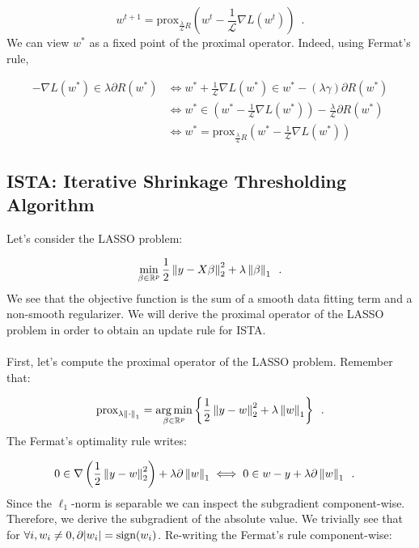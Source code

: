 \documentclass[a4paper,10pt]{article}
\theoremstyle{definition}
\begin{document}
\begin{equation*}
    w^{t+1} = \text{prox}_{\frac{\lambda}{\mathcal{L}}R}
    (w^t - \frac{1}{\mathcal{L}}\nabla L(w^{t}))
    \enspace .
\end{equation*}
%
We can view $w^*$ as a fixed point of the proximal operator. Indeed, using Fermat's rule,

\begin{align*}
    -\nabla L(w^*) \in \lambda \partial R(w^*)
    & \iff w^* + \frac{1}{\mathcal{L}} \nabla L(w^*) \in w^* - (\lambda\gamma) \partial R(w^*) \\
    & \iff w^* \in (w^* - \frac{1}{\mathcal{L}} \nabla L(w^*)) - \frac{\lambda}{\mathcal{L}} \partial R(w^*) \\
    & \iff w^* = \text{prox}_{\frac{\lambda}{\mathcal{L}} R}(w^* - \frac{1}{\mathcal{L}} \nabla L(w^*))
\end{align*}

\subsection*{ISTA: Iterative Shrinkage Thresholding Algorithm}
\label{ista}

Let's consider the LASSO problem:

\begin{equation*}
    \min_{\beta \in \mathbb{R}^p} \frac{1}{2}
    \left \lVert y - X\beta \right \rVert_2^2
    + \lambda \left \lVert \beta \right \rVert_1
    \enspace .
\end{equation*}
%
We see that the objective function is the sum of a smooth data fitting term and
a non-smooth regularizer. We will derive the proximal operator of the LASSO problem 
in order to obtain an update rule for ISTA.
\\
\\
First, let's compute the proximal operator of the LASSO problem. Remember that:

\begin{equation*}
    \text{prox}_{\lambda\left \lVert \cdot \right \rVert_1}
    = 
    \operatorname*{arg\,min}_{\beta \in \mathbb{R}^p} 
    \left\{
        \frac{1}{2}
        \left \lVert y - w \right \rVert_2^2
        + \lambda \left \lVert w \right \rVert_1
    \right\}
    \enspace .
\end{equation*}
%
The Fermat's optimality rule writes:

\begin{align*}
    0 \in \nabla
    \left(
        \frac{1}{2}
        \left \lVert y - w \right \rVert_2^2
    \right) 
    + \lambda \partial \left \lVert w \right \rVert_1
    &\iff 0 \in
    w - y + \lambda \partial \left \lVert w \right \rVert_1
    \enspace .
\end{align*}
%
Since the $\ell_1$-norm is separable we can inspect the subgradient component-wise.
Therefore, we derive the subgradient of the absolute value. We trivially see that
for $\forall i, w_i \neq 0, \partial \lvert w_i \rvert = \text{sign}(w_i)$.
Re-writing the Fermat's rule component-wise:
\end{document}
